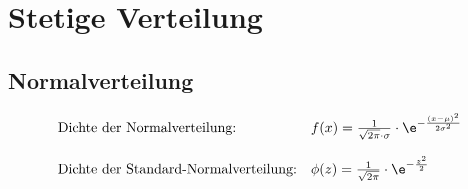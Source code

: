 \section{Stetige Verteilung}

\subsection{Normalverteilung}
\begin{align*}
\begin{array}{ll}
\mbox{Dichte der Normalverteilung:} & f(x) = \frac{1}{\sqrt{2 \pi} \cdot \sigma} \cdot \e^{- \frac{(x-\mu)^2}{2 \sigma^2}}\\
{} & {} \\
\mbox{Dichte der Standard-Normalverteilung:} & \phi(z) = \frac{1}{\sqrt{2 \pi}} \cdot \e^{- \frac{z^2}{2}}\\
\end{array}
\end{align*}
